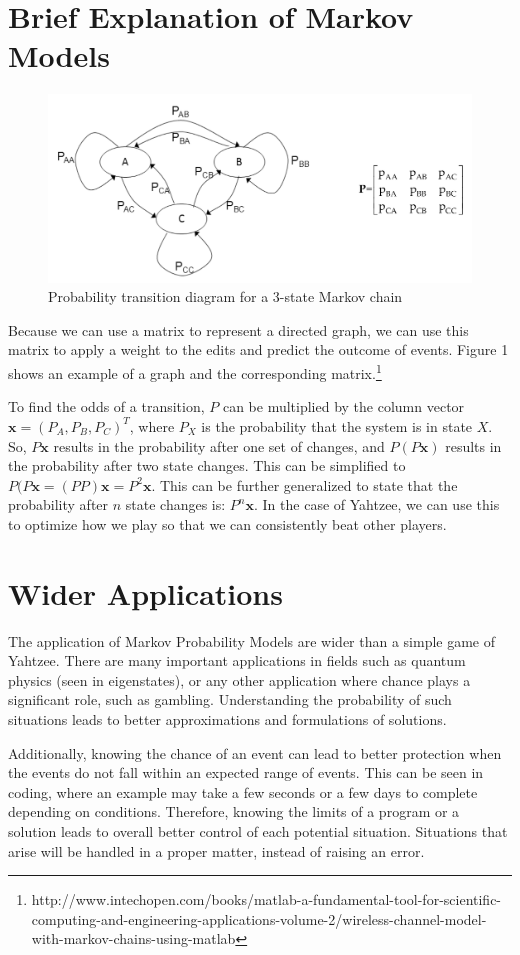 \documentclass[12pt, letterpaper, twoside]{article}
\begin{document}
\section{Brief Explanation of Markov Models}

\begin{figure}
  \includegraphics[width=\linewidth]{image11.jpeg}
  \caption[3-State Markov]{Probability transition diagram for a 3-state Markov chain}
  \label{state}
\end{figure}

Because we can use a matrix to represent a directed graph, we can use this matrix
to apply a weight to the edits and predict the outcome of events. Figure 1
shows an example of a graph and the corresponding matrix.\footnote{http://www.intechopen.com/books/matlab-a-fundamental-tool-for-scientific-computing-and-engineering-applications-volume-2/wireless-channel-model-with-markov-chains-using-matlab}

To find the odds of a transition, $P$ can be multiplied by the column vector
$\mathbf{x}=({P_A, P_B, P_C})^T$, where $P_X$ is the probability that the system
is in state $X$. So, $P\mathbf{x}$ results in the probability after one set
of changes, and $P(P\mathbf{x})$ results in the probability after two state
changes. This can be simplified to $P(P\mathbf{x} = (PP)\mathbf{x} = P^2\mathbf{x}$.
This can be further generalized to state that the probability after $n$ state
changes is: $P^n\mathbf{x}$. In the case of Yahtzee, we can use this to optimize
how we play so that we can consistently beat other players.

\section{Wider Applications}

The application of Markov Probability Models are wider than a simple game
of Yahtzee. There are many important applications in fields such as quantum
physics (seen in eigenstates), or any other application where chance plays a
significant role, such as gambling. Understanding the probability of such
situations leads to better approximations and formulations of solutions.

Additionally, knowing the chance of an event can lead to better protection
when the events do not fall within an expected range of events. This can be
seen in coding, where an example may take a few seconds or a few days to
complete depending on conditions. Therefore, knowing the limits of a program
or a solution leads to overall better control of each potential situation.
Situations that arise will be handled in a proper matter, instead of raising
an error. 
\end{document}
